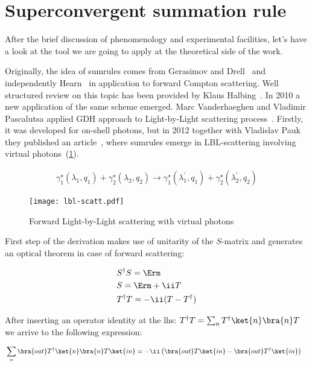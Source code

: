 \section{Superconvergent summation rule} \label{sec:intro:sumrules}
After the brief discussion of phenomenology and experimental facilities, let's have a look at the tool we are going to apply at the theoretical side of the work.

Originally,  the idea of sumrules comes from Gerasimov and Drell~\cite{gdh-g-orig} and independently Hearn~\cite{gdh-dh-orig} in application to forward Compton scattering. Well structured review on this topic has been provided by Klaus Halbing~\cite{gdh-helbing}. In 2010 a new application of the same scheme emerged. Marc Vanderhaeghen and Vladimir Pascalutsa applied GDH approach to Light-by-Light scattering process~\cite{lbl-sum1}. Firstly, it was developed for on-shell photons, but in 2012 together with Vladislav Pauk they published an article~\cite{lbl-sum2}, where sumrules emerge in LBL-scattering involving virtual photons~(\cref{fig:lbl-scatt}). 

\begin{align} \label{eq:lbl-scatt}
    \gamma^\star_1(\lambda_1, q_1) + \gamma^\star_2(\lambda_2, q_2) \rightarrow \gamma^\star_1(\lambda_1^\prime, q_1) + \gamma^\star_2(\lambda_2^\prime, q_2) 
\end{align}

\begin{figure}
    \centering
    \texttt{[image: lbl-scatt.pdf]}
    \caption{Forward Light-by-Light scattering with virtual photons \label{fig:lbl-scatt}}
\end{figure}

First step of the derivation makes use of unitarity of the $S$-matrix and generates an optical theorem in case of forward scattering:

\begin{align}
    & S^\dag S = \Erm \\
    & S = \Erm + \ii T \\
    & T^\dag T = -\ii(T - T^\dag)
\end{align}

After inserting an operator identity at the lhs: $T^\dag T = \sum_{n} T^\dag \ket{n}\bra{n} T$ we arrive to the following expression:

\begin{align}
    & \sum_{n} \bra{out} T^\dag \ket{n}\bra{n} T \ket{in} = -\ii \left( \bra{out} T \ket{in} - \bra{out} T^\dag \ket{in} \right)
\end{align}

